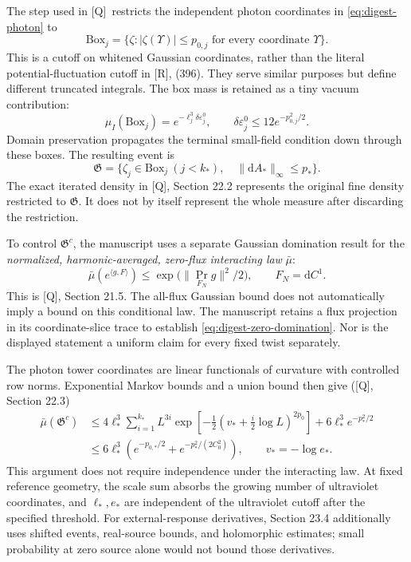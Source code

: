 \documentclass[11pt]{article}
\numberwithin{equation}{section}
\newcommand{\dd}{\mathrm d}
\newcommand{\Q}{\textup{[Q]}}
\newcommand{\UR}{\textup{[R]}}
\begin{document}
The step used in \Q\ restricts the independent photon coordinates
in \eqref{eq:digest-photon} to
\begin{equation}
 \mathrm{Box}_j=\{\zeta:|\zeta(\Upsilon)|\le p_{0,j}
                              \text{ for every coordinate }\Upsilon\}.
\end{equation}
This is a cutoff on whitened Gaussian coordinates, rather than the
literal potential-fluctuation cutoff in \UR, (396). They serve
similar purposes but define different truncated integrals. The box
mass is retained as a tiny vacuum contribution:
\begin{equation}
 \mu_I(\mathrm{Box}_j)
   =e^{-\ell_j^3\delta\varepsilon_j^0},\qquad
 \delta\varepsilon_j^0\le12e^{-p_{0,j}^2/2}.
\end{equation}
Domain preservation propagates the terminal small-field condition
down through these boxes. The resulting event is
\begin{equation}
 \mathfrak G=\bigl\{\zeta_j\in\mathrm{Box}_j\ (j<k_*),\quad
                     \|\dd A_*\|_\infty\le p_*\bigr\}.
 \label{eq:digest-good-event}
\end{equation}
The exact iterated density in \Q, Section 22.2 represents the original
fine density restricted to $\mathfrak G$. It does not by itself
represent the whole measure after discarding the restriction.

To control $\mathfrak G^c$, the manuscript uses a separate Gaussian
domination result for the \emph{normalized, harmonic-averaged,
zero-flux interacting law} $\bar\mu$:
\begin{equation}
 \bar\mu(e^{\langle g,F\rangle})
  \le \exp\bigl(\|\operatorname{Pr}_{F_N}g\|^2/2\bigr),
 \qquad F_N=\dd C^1.
 \label{eq:digest-zero-domination}
\end{equation}
This is \Q, Section 21.5. The all-flux Gaussian bound does not
automatically imply a bound on this conditional law. The manuscript
retains a flux projection in its coordinate-slice trace to establish
\eqref{eq:digest-zero-domination}. Nor is the displayed statement a
uniform claim for every fixed twist separately.

The photon tower coordinates are linear functionals of curvature
with controlled row norms. Exponential Markov bounds and a union
bound then give (\Q, Section 22.3)
\begin{align}
 \bar\mu(\mathfrak G^c)
 &\le4\ell_*^3\sum_{i=1}^{k_*}L^{3i}
   \exp\left[-\tfrac12
          (v_*+\tfrac i2\log L)^{2p_0}\right]
       +6\ell_*^3e^{-p_*^2/2}\\
 &\le6\ell_*^3
       \left(e^{-p_{0,*}/2}+e^{-p_*^2/(2C_0^2)}\right),
 \qquad v_*=-\log e_*.
 \label{eq:digest-tail}
\end{align}
This argument does not require independence under the interacting
law. At fixed reference geometry, the scale sum absorbs the growing
number of ultraviolet coordinates, and $\ell_*,e_*$ are independent
of the ultraviolet cutoff after the specified threshold.
For external-response derivatives, Section 23.4 additionally uses
shifted events, real-source bounds, and holomorphic estimates; small
probability at zero source alone would not bound those derivatives.
\end{document}
